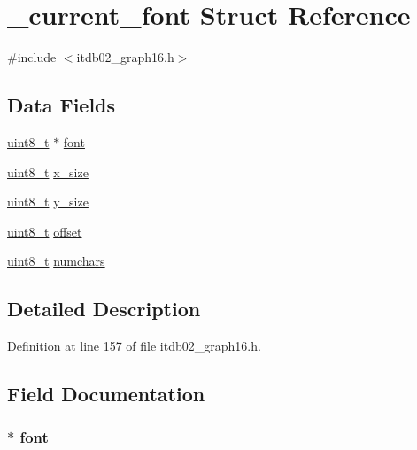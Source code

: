 \hypertarget{struct__current__font}{\section{\-\_\-current\-\_\-font Struct Reference}
\label{struct__current__font}
}


{\ttfamily \#include $<$itdb02\-\_\-graph16.\-h$>$}

\subsection*{Data Fields}
\begin{DoxyCompactItemize}
\item 
\hyperlink{p32_2include_2pinguino_2core_2typedef_8h_aba7bc1797add20fe3efdf37ced1182c5}{uint8\-\_\-t} $\ast$ \hyperlink{struct__current__font_a252ab0700d71b7234248dc19ae1e7c15}{font}
\item 
\hyperlink{p32_2include_2pinguino_2core_2typedef_8h_aba7bc1797add20fe3efdf37ced1182c5}{uint8\-\_\-t} \hyperlink{struct__current__font_ab94ee1fb70d71eebd93cc53fe572aefb}{x\-\_\-size}
\item 
\hyperlink{p32_2include_2pinguino_2core_2typedef_8h_aba7bc1797add20fe3efdf37ced1182c5}{uint8\-\_\-t} \hyperlink{struct__current__font_a8aa64d195e472d3ca86416f9c2d7587c}{y\-\_\-size}
\item 
\hyperlink{p32_2include_2pinguino_2core_2typedef_8h_aba7bc1797add20fe3efdf37ced1182c5}{uint8\-\_\-t} \hyperlink{struct__current__font_aa9fff43968831437a312428836cab362}{offset}
\item 
\hyperlink{p32_2include_2pinguino_2core_2typedef_8h_aba7bc1797add20fe3efdf37ced1182c5}{uint8\-\_\-t} \hyperlink{struct__current__font_af1102643a0ac0e61d187236dcf9adedf}{numchars}
\end{DoxyCompactItemize}


\subsection{Detailed Description}


Definition at line 157 of file itdb02\-\_\-graph16.\-h.



\subsection{Field Documentation}
\hypertarget{struct__current__font_a252ab0700d71b7234248dc19ae1e7c15}{
\subsubsection[{font}]{ $\ast$ font}}\label{struct__current__font_a252ab0700d71b7234248dc19ae1e7c15}


